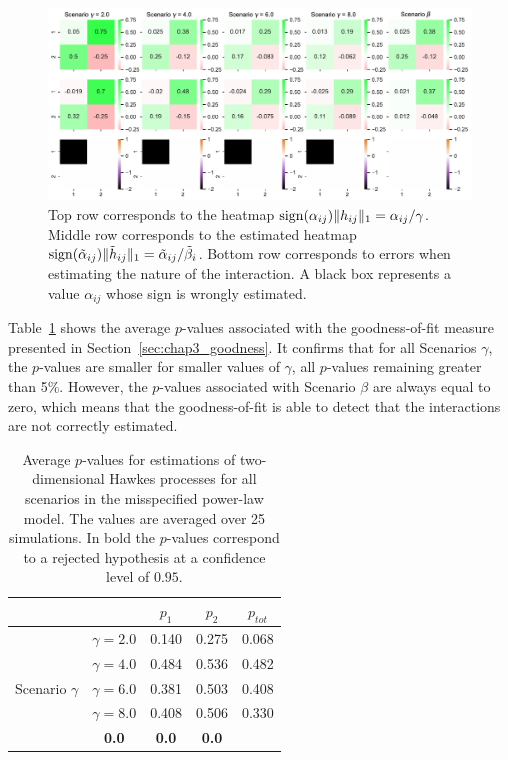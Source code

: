{\begin{figure}[!ht]
     \centering
     \includegraphics[width=0.9\linewidth]{images/chapter3/heatmap_powerlaw_both.pdf}
     \caption{Top row corresponds to the heatmap $\operatorname{sign}(\alpha_{ij})\| h_{ij} \|_1 = \alpha_{ij}/\gamma$. Middle row corresponds to the estimated heatmap $\operatorname{sign}(\tilde \alpha_{ij})\| \tilde h_{ij}\|_1 = \tilde \alpha_{ij}/ \tilde\beta_{i}$. Bottom row corresponds to errors when estimating the nature of the interaction. A black box represents a value $\alpha_{ij}$ whose sign is wrongly estimated.}
     \label{fig:chap3_heatmap_powerlaw}
     \end{figure}}

Table~\ref{tab:chap3_p_values_powerlaw} shows the average $p$-values associated with the goodness-of-fit measure presented in Section~\ref{sec:chap3_goodness}. It confirms that for all Scenarios $\gamma$, the $p$-values are smaller for smaller values of $\gamma$, all $p$-values remaining greater than 5\%. However, the $p$-values associated with Scenario $\beta$ are always equal to zero, which means that the goodness-of-fit is able to detect that the interactions are not correctly estimated. 

\begin{table}[!ht]
    \begin{center}
    \centering
    \begin{tabular}{c|c|ccc}
         \multicolumn{2}{c}{} & $p_1$ & $p_2$ & $p_{tot}$\\
         \toprule
         \multirow{5}{*}{Scenario $\gamma$} & $\gamma = 2.0$ & 0.140 & 0.275 & 0.068\\
         & $\gamma = 4.0$ & 0.484 & 0.536 & 0.482\\
         & $\gamma = 6.0$ & 0.381 & 0.503 & 0.408\\
         & $\gamma = 8.0$ & 0.408 & 0.506 & 0.330\\
         \midrule
         \multicolumn{2}{c|}{Scenario $\beta$} & \textbf{0.0} & \textbf{0.0} & \textbf{0.0}
    \end{tabular}
    \caption{Average $p$-values for estimations of two-dimensional Hawkes processes for all scenarios in the misspecified power-law model. The values are averaged over 25 simulations. In bold the $p$-values correspond to a rejected hypothesis at a confidence level of $0.95$.}
    \label{tab:chap3_p_values_powerlaw}
    \end{center}
    \end{table}


